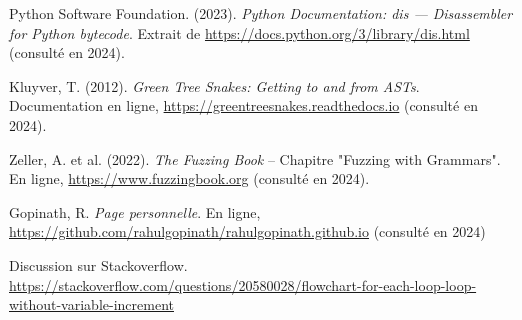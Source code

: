 \begin{thebibliography}{99}
 Python Software Foundation. (2023). \textit{Python Documentation: dis --- Disassembler for Python bytecode}. Extrait de \url{https://docs.python.org/3/library/dis.html} (consulté en 2024).

 Kluyver, T. (2012). \textit{Green Tree Snakes: Getting to and from ASTs}. Documentation en ligne, \url{https://greentreesnakes.readthedocs.io} (consulté en 2024).

 Zeller, A. et al. (2022). \textit{The Fuzzing Book} – Chapitre "Fuzzing with Grammars". En ligne, \url{https://www.fuzzingbook.org} (consulté en 2024).

 Gopinath, R. \textit{Page personnelle}. En ligne, \url{https://github.com/rahulgopinath/rahulgopinath.github.io} (consulté en 2024)

 Discussion sur Stackoverflow. \url{https://stackoverflow.com/questions/20580028/flowchart-for-each-loop-loop-without-variable-increment}

\end{thebibliography}


